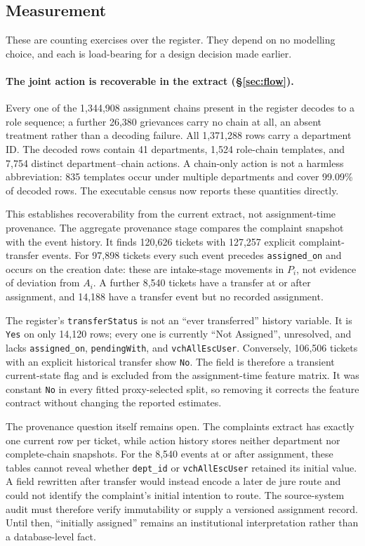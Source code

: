 \documentclass[11pt,a4paper]{article}
\theoremstyle{plain}
\theoremstyle{definition}
\theoremstyle{remark}
\newcommand{\code}[1]{\texttt{\small #1}}
\begin{document}
\subsection{Measurement}\label{sec:ev-measure}

These are counting exercises over the register. They depend on no modelling choice, and each is
load-bearing for a design decision made earlier.

\paragraph{The joint action is recoverable in the extract (\S\ref{sec:flow}).} Every one of the
1,344,908 assignment chains present in the register decodes to a role sequence; a further 26,380
grievances carry no chain at all, an absent treatment rather than a decoding failure. All
1,371,288 rows carry a department ID. The decoded rows contain 41 departments, 1,524 role-chain
templates, and 7,754 distinct department--chain actions. A chain-only action is not a harmless
abbreviation: 835 templates occur under multiple departments and cover 99.09\% of decoded rows.
The executable census now reports these quantities directly.

This establishes recoverability from the current extract, not assignment-time provenance. The
aggregate provenance stage compares the complaint snapshot with the event history. It finds
120,626 tickets with 127,257 explicit complaint-transfer events. For 97,898 tickets every such
event precedes \code{assigned\_on} and occurs on the creation date: these are intake-stage
movements in $P_i$, not evidence of deviation from $A_i$. A further 8,540 tickets have a
transfer at or after assignment, and 14,188 have a transfer event but no recorded assignment.

The register's \code{transferStatus} is not an ``ever transferred'' history variable. It is
\code{Yes} on only 14,120 rows; every one is currently ``Not Assigned'', unresolved, and lacks
\code{assigned\_on}, \code{pendingWith}, and \code{vchAllEscUser}. Conversely, 106,506 tickets
with an explicit historical transfer show \code{No}. The field is therefore a transient
current-state flag and is excluded from the assignment-time feature matrix. It was constant
\code{No} in every fitted proxy-selected split, so removing it corrects the feature contract
without changing the reported estimates.

The provenance question itself remains open. The complaints extract has exactly one current row
per ticket, while action history stores neither department nor complete-chain snapshots. For the
8,540 events at or after assignment, these tables cannot reveal whether \code{dept\_id} or
\code{vchAllEscUser} retained its initial value. A field rewritten after transfer would instead
encode a later de jure route and could not identify the complaint's initial intention to route.
The source-system audit must therefore verify immutability or supply a versioned assignment
record. Until then, ``initially assigned'' remains an institutional interpretation rather than
a database-level fact.
\end{document}
